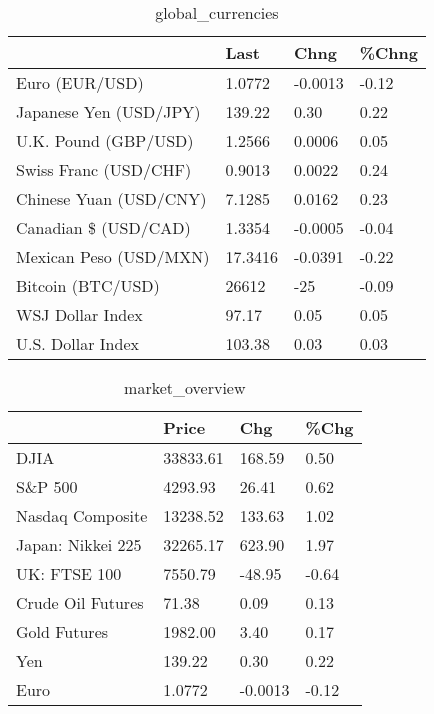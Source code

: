 \documentclass{article}%
\begin{document}
%


\begin{table}[htbp]%
\caption{global\_currencies}%
\centering%
\begin{adjustbox}{width=1\textwidth}%
\begin{tabular}{llll}
\toprule
                       &    Last &    Chng & \%Chng \\
\midrule
        Euro (EUR/USD) &  1.0772 & -0.0013 & -0.12 \\
Japanese Yen (USD/JPY) &  139.22 &    0.30 &  0.22 \\
  U.K. Pound (GBP/USD) &  1.2566 &  0.0006 &  0.05 \\
 Swiss Franc (USD/CHF) &  0.9013 &  0.0022 &  0.24 \\
Chinese Yuan (USD/CNY) &  7.1285 &  0.0162 &  0.23 \\
  Canadian \$ (USD/CAD) &  1.3354 & -0.0005 & -0.04 \\
Mexican Peso (USD/MXN) & 17.3416 & -0.0391 & -0.22 \\
     Bitcoin (BTC/USD) &   26612 &     -25 & -0.09 \\
      WSJ Dollar Index &   97.17 &    0.05 &  0.05 \\
     U.S. Dollar Index &  103.38 &    0.03 &  0.03 \\
\bottomrule
\end{tabular}
%
\end{adjustbox}%
\end{table}

%


\begin{table}[htbp]%
\caption{market\_overview}%
\centering%
\begin{adjustbox}{width=1\textwidth}%
\begin{tabular}{llll}
\toprule
                  &    Price &     Chg &  \%Chg \\
\midrule
             DJIA & 33833.61 &  168.59 &  0.50 \\
          S\&P 500 &  4293.93 &   26.41 &  0.62 \\
 Nasdaq Composite & 13238.52 &  133.63 &  1.02 \\
Japan: Nikkei 225 & 32265.17 &  623.90 &  1.97 \\
     UK: FTSE 100 &  7550.79 &  -48.95 & -0.64 \\
Crude Oil Futures &    71.38 &    0.09 &  0.13 \\
     Gold Futures &  1982.00 &    3.40 &  0.17 \\
              Yen &   139.22 &    0.30 &  0.22 \\
             Euro &   1.0772 & -0.0013 & -0.12 \\
\bottomrule
\end{tabular}
%
\end{adjustbox}%
\end{table}

%
\end{document}
